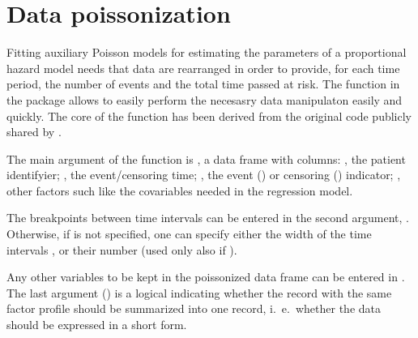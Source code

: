 \documentclass[article,shortnames, nojss]{jss}\usepackage[]{graphicx}\usepackage[]{color}
\begin{document}
% 
{}

\appendix
\section{Data poissonization}\label{sec:poisson}
Fitting auxiliary Poisson models for estimating the parameters of 
  a proportional hazard model \citep{Whitehead80, crowtherEtal12}
  needs that data are rearranged in order to provide,
  for each time period, the number of events and the 
  total time passed at risk.
The function in the  package
  allows to easily perform the necesasry data manipulaton
  easily and quickly.
The core of the function has been derived from the original code
  publicly shared by \cite{Koval}.

The main argument of the  function is
  , a data frame with columns: 
  , the patient identifyier;
  , the event/censoring time;
  , the event () or censoring () indicator;
  , other factors such like the covariables needed
  in the regression model.

The breakpoints between time intervals can be entered in the second argument,
  .
Otherwise, if  is not specified,
  one can specify either the width of the time intervals ,
  or their number 
  (used only also if ).

Any other variables to be kept in the poissonized data frame can be entered in
  .
The last argument () is a logical
  indicating whether the record with the same factor profile
  should be summarized into one record,
  i.~e.\ whether the data should be expressed in a short form.
\end{document}
